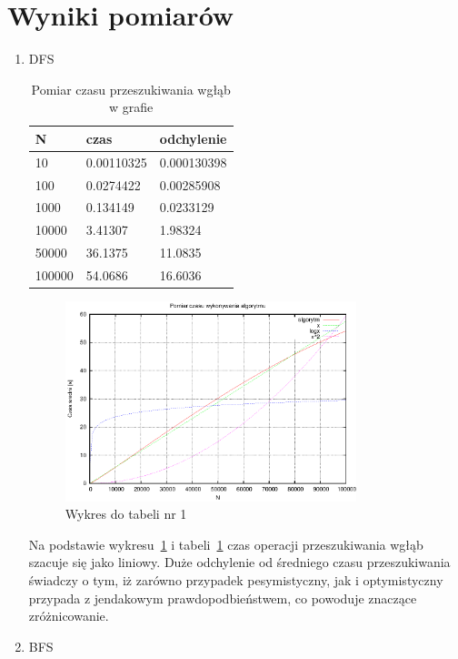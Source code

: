\documentclass[a4paper,11pt]{article}
\begin{document}
\section{Wyniki pomiarów}
\begin{enumerate}
 \item DFS
   
  \begin{table}[th]
  \centering
    \caption{Pomiar czasu przeszukiwania wgłąb w grafie}

      \begin{tabular}{|l|l|l|}
	\hline
	N & czas & odchylenie \\
    \hline
 10 & 0.00110325 & 0.000130398\\
 \hline
100 & 0.0274422 & 0.00285908\\
\hline
1000 & 0.134149 & 0.0233129\\
\hline
10000 & 3.41307 & 1.98324\\
\hline
50000 & 36.1375 & 11.0835\\
\hline
100000 & 54.0686 & 16.6036\\
\hline
    \end{tabular}
    \label{tab1}
    \end{table}
    \newpage
 \begin{figure}[th]
\centering
\includegraphics[width=0.8\textwidth]{../prj/wykres13.eps}
\caption{Wykres do tabeli nr 1}
\label{Wykres1}
\end{figure} 
Na podstawie wykresu~\ref{Wykres1} i tabeli~\ref{tab1} czas operacji przeszukiwania wgłąb szacuje się jako liniowy. Duże odchylenie od średniego czasu przeszukiwania świadczy o tym,
 iż zarówno przypadek pesymistyczny, jak i optymistyczny przypada z jendakowym prawdopodbieństwem, co powoduje znaczące zróżnicowanie.
\item BFS
  \begin{table}[th]
  \centering
  

\end{table}
\end{enumerate}
\end{document}
